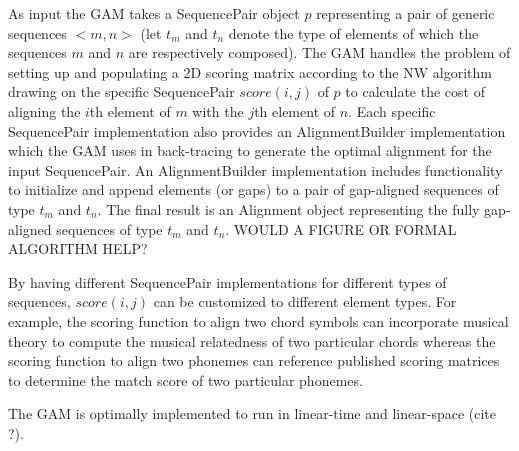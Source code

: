 \documentclass[12pt]{article}
\begin{document}
As input the GAM takes a SequencePair object $p$ representing a pair of generic sequences $<m,n>$ (let $t_m$ and $t_n$ denote the type of elements of which the sequences $m$ and $n$ are respectively composed). The GAM handles the problem of setting up and populating a 2D scoring matrix according to the NW algorithm drawing on the specific SequencePair $score(i,j)$ of $p$ to calculate the cost of aligning the $i$th element of $m$ with the $j$th element of $n$. Each specific SequencePair implementation also provides an AlignmentBuilder implementation which the GAM uses in back-tracing to generate the optimal alignment for the input SequencePair. An AlignmentBuilder implementation includes functionality to initialize and append elements (or gaps) to a pair of gap-aligned sequences of type $t_m$ and $t_n$.  The final result is an Alignment object representing the fully gap-aligned sequences of type $t_m$ and $t_n$. WOULD A FIGURE OR FORMAL ALGORITHM HELP?

By having different SequencePair implementations for different types of sequences, $score(i,j)$ can be customized to different element types. For example, the scoring function to align two chord symbols can incorporate musical theory to compute the musical relatedness of two particular chords whereas the scoring function to align two phonemes can reference published scoring matrices to determine the match score of two particular phonemes.

The GAM is optimally implemented to run in linear-time and linear-space (cite ?).

\newcommand{\gbfs}{\ensuremath{\mbox{\sc MAX-DIR Greedy Heuristic}}}
\renewcommand{\algorithmicrequire}{\textbf{Input:}}
\begin{algorithm}[b]
\caption{$\gbfs$}\label{alg:bidirected_subgraph} 
\begin{algorithmic}[1]
{}
\ENDFOR
\ENDIF
{}
\ELSE
{}
\ENDIF
\ENDWHILE
{}
\end{algorithmic}
\end{algorithm}\
\end{document}
